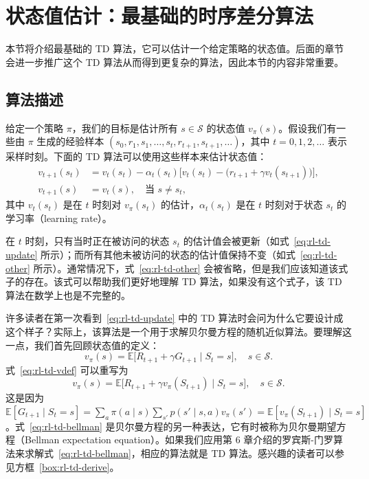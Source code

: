 \section{状态值估计：最基础的时序差分算法}
\label{sec:rl-td-state-value}

本节将介绍最基础的 TD 算法，它可以估计一个给定策略的状态值。后面的章节会进一步推广这个 TD 算法从而得到更复杂的算法，因此本节的内容非常重要。

\subsection{算法描述}
\label{sec:rl-td-sv-algorithm}

给定一个策略 $\pi$，我们的目标是估计所有 $s \in \mathcal{S}$ 的状态值 $v_{\pi}(s)$。假设我们有一些由 $\pi$ 生成的经验样本 $(s_0, r_1, s_1, \dots, s_t, r_{t+1}, s_{t+1}, \ldots)$，其中 $t = 0, 1, 2, \ldots$ 表示采样时刻。下面的 TD 算法可以使用这些样本来估计状态值：
\begin{align}
  v_{t+1}(s_t) &= v_t(s_t) - \alpha_t(s_t) \Big[ v_t(s_t) - \big( r_{t+1} + \gamma v_t(s_{t+1}) \big) \Big], \label{eq:rl-td-update} \\
  v_{t+1}(s) &= v_t(s), \quad \text{当 } s \neq s_t, \label{eq:rl-td-other}
\end{align}
其中 $v_t(s_t)$ 是在 $t$ 时刻对 $v_{\pi}(s_t)$ 的估计，$\alpha_t(s_t)$ 是在 $t$ 时刻对于状态 $s_t$ 的学习率（learning rate）。

在 $t$ 时刻，只有当时正在被访问的状态 $s_t$ 的估计值会被更新（如式~\eqref{eq:rl-td-update} 所示）；而所有其他未被访问的状态的估计值保持不变（如式~\eqref{eq:rl-td-other} 所示）。通常情况下，式~\eqref{eq:rl-td-other} 会被省略，但是我们应该知道该式子的存在。该式可以帮助我们更好地理解 TD 算法，如果没有这个式子，该 TD 算法在数学上也是不完整的。

许多读者在第一次看到~\eqref{eq:rl-td-update} 中的 TD 算法时会问为什么它要设计成这个样子？实际上，该算法是一个用于求解贝尔曼方程的随机近似算法。要理解这一点，我们首先回顾状态值的定义：
\begin{equation}
  v_{\pi}(s) = \mathbb{E}\big[ R_{t+1} + \gamma G_{t+1} \mid S_t = s \big], \quad s \in \mathcal{S}.
  \label{eq:rl-td-vdef}
\end{equation}
式~\eqref{eq:rl-td-vdef} 可以重写为
\begin{equation}
  v_{\pi}(s) = \mathbb{E}\big[ R_{t+1} + \gamma v_{\pi}(S_{t+1}) \mid S_t = s \big], \quad s \in \mathcal{S}.
  \label{eq:rl-td-bellman}
\end{equation}
这是因为 $\mathbb{E}[G_{t+1} \mid S_t = s] = \sum_a \pi(a \mid s) \sum_{s'} p(s' \mid s, a) v_{\pi}(s') = \mathbb{E}[v_{\pi}(S_{t+1}) \mid S_t = s]$。式~\eqref{eq:rl-td-bellman} 是贝尔曼方程的另一种表达，它有时被称为贝尔曼期望方程（Bellman expectation equation）。如果我们应用第 6 章介绍的罗宾斯-门罗算法来求解式~\eqref{eq:rl-td-bellman}，相应的算法就是 TD 算法。感兴趣的读者可以参见方框~\ref{box:rl-td-derive}。

